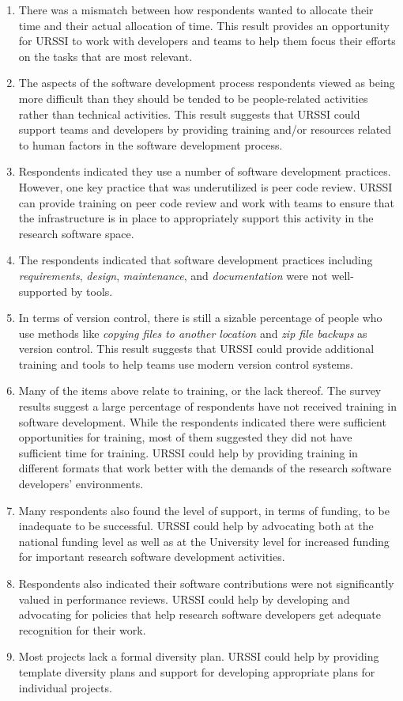 \documentclass[
]{book}
\begin{document}
\begin{enumerate}
\def\labelenumi{\arabic{enumi}.}
\item
  There was a mismatch between how respondents wanted to allocate their
  time and their actual allocation of time. This result provides an opportunity
  for URSSI to work with developers and teams to help them focus their efforts
  on the tasks that are most relevant.
\item
  The aspects of the software development process respondents viewed as
  being more difficult than they should be tended to be people-related
  activities rather than technical activities. This result suggests that URSSI
  could support teams and developers by providing training and/or
  resources related to human factors in the software development process.
\item
  Respondents indicated they use a number of software development practices.
  However, one key practice that was underutilized is peer code review. URSSI
  can provide training on peer code review and work with teams to ensure that
  the infrastructure is in place to appropriately support this activity in the
  research software space.
\item
  The respondents indicated that software development practices including
  \emph{requirements}, \emph{design}, \emph{maintenance}, and \emph{documentation} were not
  well-supported by tools.
\item
  In terms of version control, there is still a sizable percentage of
  people who use methods like \emph{copying files to another location} and
  \emph{zip file backups} as version control. This result suggests that URSSI
  could provide additional training and tools to help teams use modern
  version control systems.
\item
  Many of the items above relate to training, or the lack thereof. The
  survey results suggest a large percentage of respondents have not received
  training in software development. While the respondents indicated there were
  sufficient opportunities for training, most of them suggested they did not
  have sufficient time for training. URSSI could help by providing training
  in different formats that work better with the demands of the research
  software developers' environments.
\item
  Many respondents also found the level of support, in terms of funding,
  to be inadequate to be successful. URSSI could help by advocating both at
  the national funding level as well as at the University level for increased
  funding for important research software development activities.
\item
  Respondents also indicated their software contributions were not
  significantly valued in performance reviews. URSSI could help by developing
  and advocating for policies that help research software developers get
  adequate recognition for their work.
\item
  Most projects lack a formal diversity plan. URSSI could help by providing
  template diversity plans and support for developing
  appropriate plans for individual projects.
\end{enumerate}
\end{document}
